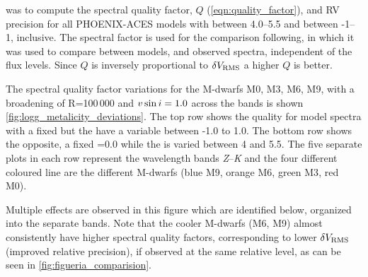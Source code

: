 \Eniric{} was to compute the spectral quality factor, \(Q\) (\cref{eqn:quality_factor}), and {RV} precision for all {PHOENIX-ACES} models with \Logg{} between 4.0--5.5 and \feh{} between -1--1, inclusive.
The spectral factor is used for the comparison following, \citet{artigau_optical_2018} in which it was used to compare between models, and observed spectra, independent of the flux levels.
Since \(Q\) is inversely proportional to \(\delta V_{\textrm{RMS}}\) a higher \(Q\) is better.

The spectral quality factor variations for the {M-dwarf}s {M0}, {M3}, {M6}, {M9}, with a broadening of R=100\,000 and $v\sin{i}=1.0$\kmps{} across the \nir{} bands is shown \cref{fig:logg_metalicity_deviations}. The top row shows the quality for model spectra with a fixed  but the have a variable \feh{} between -1.0 to 1.0.
The bottom row shows the opposite, a fixed \feh{}=0.0 while the \Logg{} is varied between 4 and 5.5.
The five separate plots in each row represent the \nir{} wavelength bands \emph{Z}--\emph{K} and the four different coloured line are the different M-dwarfs (blue {M9}, orange {M6}, green {M3}, red {M0}).

Multiple effects are observed in this figure which are identified below, organized into the separate bands. Note that the cooler M-dwarfs (M6, {M9}) almost consistently have higher spectral quality factors, corresponding to lower \({\delta V_{\textrm{RMS}}{}}\) (improved relative precision), if observed at the same relative \snr{} level, as can be seen in \cref{fig:figueria_comparision}.

